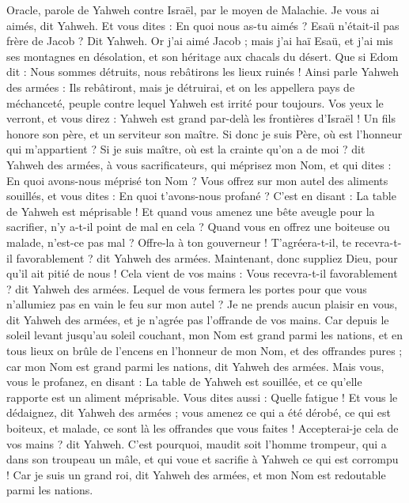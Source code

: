 \begin{multicols}{2}
\VerseOne{}Oracle, parole de Yahweh contre Israël, par le moyen de Malachie.
Je vous ai aimés, dit Yahweh. Et vous dites : En quoi nous as-tu aimés ? Esaü n'était-il pas frère de Jacob ? Dit Yahweh. Or j'ai aimé Jacob ;
mais j’ai haï Esaü, et j’ai mis ses montagnes en désolation, et son héritage aux chacals du désert.
Que si Edom dit : Nous sommes détruits, nous rebâtirons les lieux ruinés ! Ainsi parle Yahweh des armées : Ils rebâtiront, mais je détruirai, et on les appellera pays de méchanceté, peuple contre lequel Yahweh est irrité pour toujours.
Vos yeux le verront, et vous direz : Yahweh est grand par-delà les frontières d'Israël !
Un fils honore son père, et un serviteur son maître. Si donc je suis Père, où est l'honneur qui m'appartient ? Si je suis maître, où est la crainte qu'on a de moi ? dit Yahweh des armées, à vous sacrificateurs, qui méprisez mon Nom, et qui dites : En quoi avons-nous méprisé ton Nom ?
Vous offrez sur mon autel des aliments souillés, et vous dites : En quoi t'avons-nous profané ? C'est en disant : La table de Yahweh est méprisable !
Et quand vous amenez une bête aveugle pour la sacrifier, n'y a-t-il point de mal en cela ? Quand vous en offrez une boiteuse ou malade, n’est-ce pas mal ? Offre-la à ton gouverneur ! T’agréera-t-il, te recevra-t-il favorablement ? dit Yahweh des armées.
Maintenant, donc suppliez Dieu, pour qu'il ait pitié de nous ! Cela vient de vos mains : Vous recevra-t-il favorablement ? dit Yahweh des armées.
Lequel de vous fermera les portes pour que vous n’allumiez pas en vain le feu sur mon autel ? Je ne prends aucun plaisir en vous, dit Yahweh des armées, et je n’agrée pas l'offrande de vos mains.
Car depuis le soleil levant jusqu'au soleil couchant, mon Nom est grand parmi les nations, et en tous lieux on brûle de l’encens en l'honneur de mon Nom, et des offrandes pures ; car mon Nom est grand parmi les nations, dit Yahweh des armées.
Mais vous, vous le profanez, en disant : La table de Yahweh est souillée, et ce qu’elle rapporte est un aliment méprisable.
Vous dites aussi : Quelle fatigue ! Et vous le dédaignez, dit Yahweh des armées ; vous amenez ce qui a été dérobé, ce qui est boiteux, et malade, ce sont là les offrandes que vous faites ! Accepterai-je cela de vos mains ? dit Yahweh.
C'est pourquoi, maudit soit l'homme trompeur, qui a dans son troupeau un mâle, et qui voue et sacrifie à Yahweh ce qui est corrompu ! Car je suis un grand roi, dit Yahweh des armées, et mon Nom est redoutable parmi les nations.

\end{multicols}
